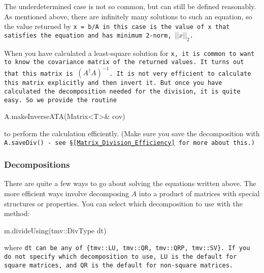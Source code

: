 The underdetermined case is not so common, but can still be defined reasonably.  
As mentioned above, there are infinitely many solutions to such an equation, so the
value returned by \tt{x = b/A} in this case is the value of \tt{x} that satisfies the 
equation and has minimum 2-norm, $||x||_2$.

When you have calculated a least-square solution for \tt{x}, it is common to want 
to know the covariance matrix of the returned values.  It turns out that this
matrix is $(A^\dagger A)^{-1}$.  It is not very efficient to calculate this matrix
explicitly and then invert it.  But once you have calculated the decomposition
needed for the division, it is quite easy.  So we provide the routine 
\begin{tmvcode}
A.makeInverseATA(Matrix<T>& cov)
\end{tmvcode}
to perform the calculation efficiently.  (Make sure you save the decomposition with 
\tt{A.saveDiv()} - see \S\ref{Matrix_Division_Efficiency} for more about this.)

\subsubsection{Decompositions}
\label{Matrix_Division_Decompositions}

There are quite a few ways to go about solving the equations written above.  
The more efficient ways involve decomposing $A$ into a product of
matrices with special structures or properties.  
You can select which decomposition to use with the method:
\begin{tmvcode}
m.divideUsing(tmv::DivType dt)
\end{tmvcode}
where \tt{dt} can be any of \tt{\{tmv::LU, tmv::QR, tmv::QRP, tmv::SV\}}.
If you do not specify which decomposition to use, \tt{LU} is the 
default for square matrices, and \tt{QR} is the default for
non-square matrices.

